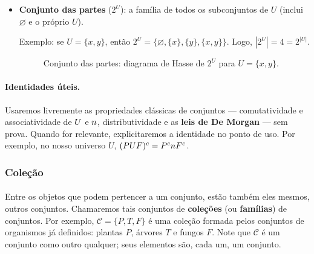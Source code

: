 \documentclass[12pt,a4paper]{article}
\def\cup{\string U}%
\def\cap{\string n}%
\begin{document}
\begin{itemize}
    \paragraph{}
    \item \textbf{Conjunto das partes} (\(2^U\)): a família de todos os subconjuntos de \(U\) (inclui \(\varnothing\) e o próprio \(U\)).
    
    Exemplo: se \(U = \{x,y\}\), então \(2^U = \{\varnothing, \{x\}, \{y\}, \{x,y\}\}\). Logo, \(|2^U|=4=2^{|U|}\).
    \begin{figure}[H]
    \centering
    \caption{Conjunto das partes: diagrama de Hasse de $2^{U}$ para $U=\{x,y\}$.}
    \label{fig:op-partes}
    \end{figure}
\end{itemize}

\paragraph{Identidades úteis.}
Usaremos livremente as propriedades clássicas de conjuntos — comutatividade e associatividade de \(\cup\) e \(\cap\), distributividade e as \textbf{leis de De Morgan} — sem prova. Quando for relevante, explicitaremos a identidade no ponto de uso. Por exemplo, no nosso universo \(U\), \((P\cup F)^c = P^c\cap F^c\).

\subsubsection{Coleção}

\paragraph{}
Entre os objetos que podem pertencer a um conjunto, estão também eles mesmos, outros conjuntos. Chamaremos tais conjuntos de \textbf{coleções} (ou \textbf{famílias}) de conjuntos. Por exemplo, \(\mathcal{C} = \{P, T, F\}\) é uma coleção formada pelos conjuntos de organismos já definidos: plantas \(P\), árvores \(T\) e fungos \(F\). Note que \(\mathcal{C}\) é um conjunto como outro qualquer; seus elementos são, cada um, um conjunto.
\end{document}
